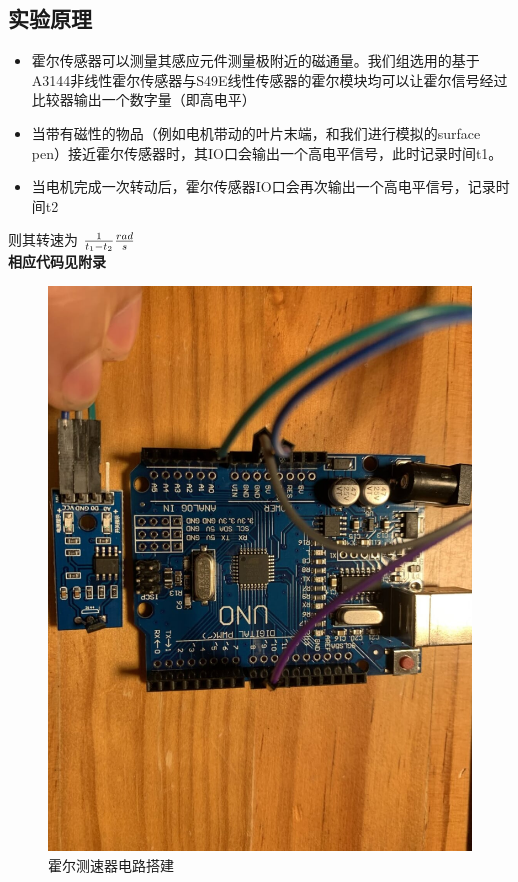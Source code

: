 \documentclass[conference]{IEEEtran}
\theoremstyle{break}
\begin{document}
\subsection{实验原理}
\begin{itemize}
        \item 霍尔传感器可以测量其感应元件测量极附近的磁通量。我们组选用的基于A3144非线性霍尔传感器与S49E线性传感器的霍尔模块均可以让霍尔信号经过比较器输出一个数字量（即高电平）
        \item 当带有磁性的物品（例如电机带动的叶片末端，和我们进行模拟的surface pen）接近霍尔传感器时，其IO口会输出一个高电平信号，此时记录时间t1。
        \item 当电机完成一次转动后，霍尔传感器IO口会再次输出一个高电平信号，记录时间t2
\end{itemize}
则其转速为 $ \frac{1}{t_1 - t_2} \\ \frac{rad}{s}$ \\
\textbf{相应代码见附录}
\begin{figure}[htbp]
        \centerline{\includegraphics[scale=0.1]{霍尔.png}}
        \caption{霍尔测速器电路搭建}
        \label{fig}
        \end{figure}
\vspace{12pt}
\newpage
\end{document}
